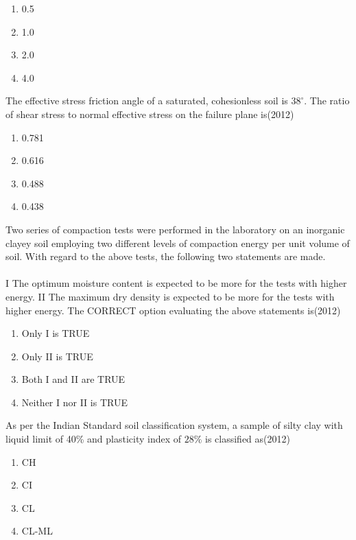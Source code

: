   \begin{multicols}{1}
			\begin{enumerate}
   \item 0.5
\item 1.0
\item  2.0
\item 4.0
 \end{enumerate}
		\end{multicols}


	\item The effective stress friction angle of a saturated, cohesionless soil is $38^{\circ}$. The ratio of shear stress to normal effective stress on the failure plane is\hfill{(2012)}

  \begin{multicols}{4}
			\begin{enumerate}
   \item 0.781
\item 0.616
\item 0.488
\item 0.438
 \end{enumerate}
		\end{multicols}


  \item  Two series of compaction tests were performed in the laboratory on an inorganic clayey soil employing two different levels of compaction energy per unit volume of soil. With regard to the above tests, the following two statements are made.\\\\
  I The optimum moisture content is expected to be more for the tests with higher energy. II The maximum dry density is expected to be more for the tests with higher energy.
The CORRECT option evaluating the above statements is\hfill{(2012)}

\begin{multicols}{1}
			\begin{enumerate}
   \item Only I is TRUE
\item Only II is TRUE
\item Both I and II are TRUE
\item Neither I nor II is TRUE
\end{enumerate}
		\end{multicols}


	\item  As per the Indian Standard soil classification system, a sample of silty clay with liquid limit of 40\% and plasticity index of $28 \%$ is classified as\hfill{(2012)}

  \begin{multicols}{4}
			\begin{enumerate}
   \item CH
\item CI
\item CL
\item CL-ML
  \end{enumerate}
		\end{multicols}


 
